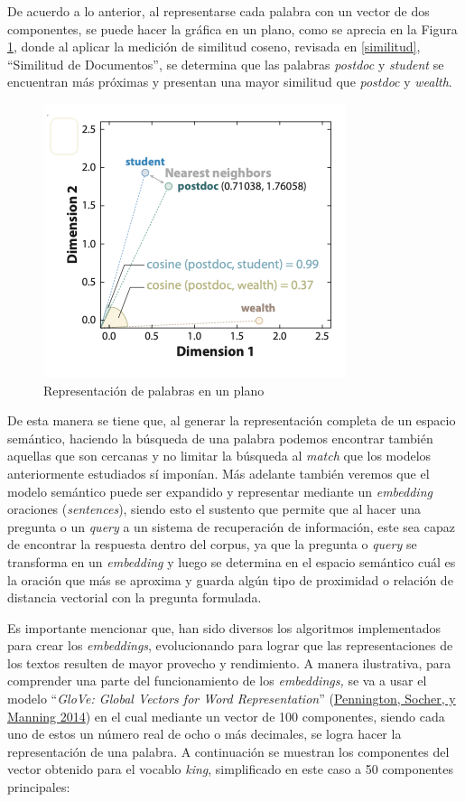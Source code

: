 \documentclass[
  12pt,
  openany]{book}
\begin{document}
De acuerdo a lo anterior, al representarse cada palabra con un vector de dos componentes, se puede hacer la gráfica en un plano, como se aprecia en la Figura \ref{fig:embeddingimg}, donde al aplicar la medición de similitud coseno, revisada en \ref{similitud}, ``Similitud de Documentos'', se determina que las palabras \emph{postdoc} y \emph{student} se encuentran más próximas y presentan una mayor similitud que \emph{postdoc} y \emph{wealth}.

\begin{figure}

{\centering \includegraphics[width=0.55\linewidth]{images/03-marco-teorico/word_vec} 

}

\caption{Representación de palabras en un plano}\label{fig:embeddingimg}
\end{figure}

De esta manera se tiene que, al generar la representación completa de un espacio semántico, haciendo la búsqueda de una palabra podemos encontrar también aquellas que son cercanas y no limitar la búsqueda al \emph{match} que los modelos anteriormente estudiados sí imponían. Más adelante también veremos que el modelo semántico puede ser expandido y representar mediante un \emph{embedding} oraciones (\emph{sentences}), siendo esto el sustento que permite que al hacer una pregunta o un \emph{query} a un sistema de recuperación de información, este sea capaz de encontrar la respuesta dentro del corpus, ya que la pregunta o \emph{query} se transforma en un \emph{embedding} y luego se determina en el espacio semántico cuál es la oración que más se aproxima y guarda algún tipo de proximidad o relación de distancia vectorial con la pregunta formulada.~

Es importante mencionar que, han sido diversos los algoritmos implementados para crear los \emph{embeddings}, evolucionando para lograr que las representaciones de los textos resulten de mayor provecho y rendimiento. A manera ilustrativa, para comprender una parte del funcionamiento de los \emph{embeddings,} se va a usar el modelo ``\emph{GloVe: Global Vectors for Word Representation}'' (\protect\hyperlink{ref-pennington2014}{Pennington, Socher, y Manning 2014}) en el cual mediante un vector de 100 componentes, siendo cada uno de estos un número real de ocho o más decimales, se logra hacer la representación de una palabra. A continuación se muestran los componentes del vector obtenido para el vocablo \emph{king}, simplificado en este caso a 50 componentes principales:
\end{document}
